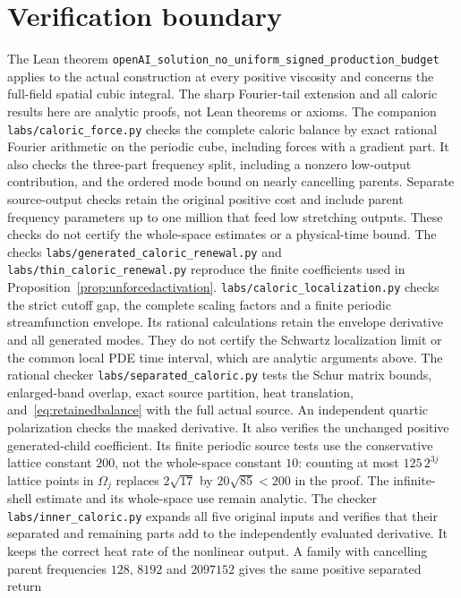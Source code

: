 \documentclass[11pt]{article}
\begin{document}
\section{Verification boundary}

The Lean theorem
\texttt{openAI\_solution\_no\_uniform\_signed\_production\_budget}
applies to the actual construction at every positive viscosity and concerns
the full-field spatial cubic integral. The sharp Fourier-tail extension
and all caloric results here are analytic proofs, not Lean theorems or
axioms. The companion \texttt{labs/caloric\_force.py} checks the complete
caloric balance by exact rational Fourier arithmetic on the periodic cube,
including forces with a gradient part. It also checks the three-part
frequency split, including a nonzero low-output contribution, and the
ordered mode bound on nearly cancelling parents. Separate source-output
checks retain the original positive cost and include parent frequency
parameters up to one million that feed low stretching outputs. These checks do not
certify the whole-space estimates or a physical-time bound.
The checks \texttt{labs/generated\_caloric\_renewal.py} and
\texttt{labs/thin\_caloric\_renewal.py} reproduce the finite coefficients
used in Proposition~\ref{prop:unforcedactivation}.
\texttt{labs/caloric\_localization.py} checks the strict cutoff gap,
the complete scaling factors and a finite periodic streamfunction
envelope. Its rational calculations retain the envelope derivative and
all generated modes. They do not certify the Schwartz localization limit
or the common local PDE time interval, which are analytic arguments above.
The rational checker \texttt{labs/separated\_caloric.py} tests the Schur
matrix bounds, enlarged-band overlap, exact source partition, heat
translation, and~\eqref{eq:retainedbalance} with the full actual source.
An independent quartic polarization checks the masked derivative.
It also verifies the unchanged positive generated-child coefficient.
Its finite periodic source tests use the conservative lattice constant
$200$, not the whole-space constant $10$: counting at most
$125\,2^{3j}$ lattice points in $\Omega_j$ replaces
$2\sqrt{17}$ by $20\sqrt{85}<200$ in the proof.
The infinite-shell estimate and its whole-space use remain analytic.
The checker \texttt{labs/inner\_caloric.py} expands all five original
inputs and verifies that their separated and remaining parts add to
the independently evaluated derivative. It keeps the correct heat rate
of the nonlinear output. A family with cancelling parent frequencies
$128$, $8192$ and $2097152$ gives the same positive separated return
\end{document}
